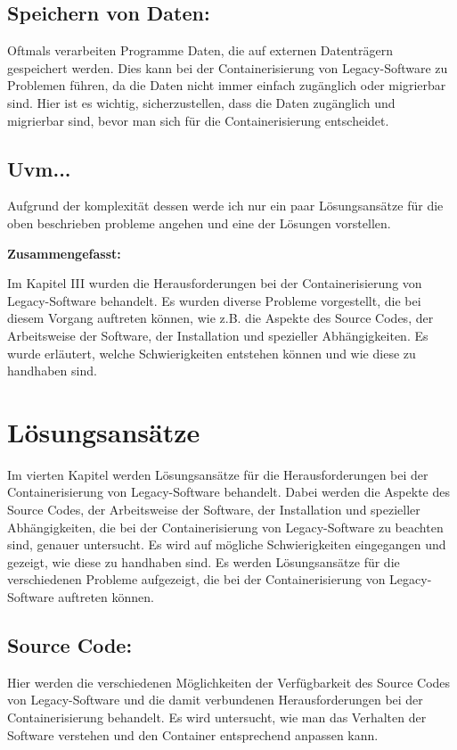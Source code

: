 \subsection{Speichern von Daten:}
Oftmals verarbeiten Programme Daten, die auf externen Datenträgern gespeichert werden.
Dies kann bei der Containerisierung von Legacy-Software zu Problemen führen, da die Daten nicht immer einfach zugänglich oder migrierbar sind.
Hier ist es wichtig, sicherzustellen, dass die Daten zugänglich und migrierbar sind, bevor man sich für die Containerisierung entscheidet.

\subsection{Uvm...}
Aufgrund der komplexität dessen werde ich nur ein paar Lösungsansätze für die oben beschrieben probleme angehen und eine der Lösungen vorstellen.

\textbf{Zusammengefasst:}

Im Kapitel III wurden die Herausforderungen bei der Containerisierung von Legacy-Software behandelt. Es wurden diverse Probleme vorgestellt, die bei diesem Vorgang auftreten können, wie z.B. die Aspekte des Source Codes, der Arbeitsweise der Software, der Installation und spezieller Abhängigkeiten. Es wurde erläutert, welche Schwierigkeiten entstehen können und wie diese zu handhaben sind.

\section{Lösungsansätze}
Im vierten Kapitel werden Lösungsansätze für die Herausforderungen bei der Containerisierung von Legacy-Software behandelt. Dabei werden die Aspekte des Source Codes, der Arbeitsweise der Software, der Installation und spezieller Abhängigkeiten, die bei der Containerisierung von Legacy-Software zu beachten sind, genauer untersucht. Es wird auf mögliche Schwierigkeiten eingegangen und gezeigt, wie diese zu handhaben sind. Es werden Lösungsansätze für die verschiedenen Probleme aufgezeigt, die bei der Containerisierung von Legacy-Software auftreten können.
\subsection{Source Code:}
Hier werden die verschiedenen Möglichkeiten der Verfügbarkeit des Source Codes von Legacy-Software und die damit verbundenen Herausforderungen bei der Containerisierung behandelt.
Es wird untersucht, wie man das Verhalten der Software verstehen und den Container entsprechend anpassen kann.
